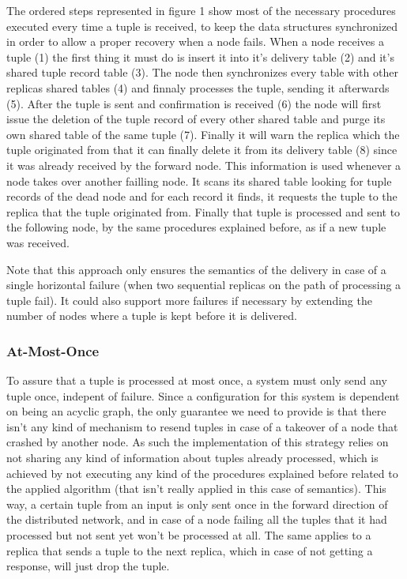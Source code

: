 \documentclass[times, 10pt,twocolumn]{article}
\begin{document}
The ordered steps represented in figure 1 show most of the necessary 
procedures executed every time a tuple is received, to keep the data structures synchronized in order to allow a
proper recovery when a node fails. When a node receives a tuple (1) the first
thing it must do is insert it into it's delivery table (2) and it's shared tuple
record table (3). The node then synchronizes every table with other replicas
shared tables (4) and finnaly processes the tuple, sending it afterwards (5). After the
tuple is sent and confirmation is received (6) the node will first issue the
deletion of the tuple record of every other shared table and purge its own
shared table of the same tuple (7). Finally it will warn the replica which the
tuple originated from that it can finally delete it from its delivery table (8)
since it was already received by the forward node. This information is
used whenever a node takes over another failling node. It scans its shared
table looking for tuple records of the dead node and for each record it finds,
it requests the tuple to the replica that the tuple originated from. Finally that tuple is
processed and sent to the following node, by the same procedures explained
before, as if a new tuple was received. 

Note that this approach only
ensures the semantics of the delivery in case of a single horizontal
failure (when two sequential replicas on the path of processing a tuple
fail). It could also support more failures if necessary by extending the
number of nodes where a tuple is kept before it is delivered.




\subsubsection{At-Most-Once}

To assure that a tuple is processed at most once, a system must only send
any tuple once, indepent of failure. Since a configuration for this system
is dependent on being an acyclic graph, the only guarantee we need to
provide is that there isn't any kind of mechanism to resend tuples in case
of a takeover of a node that crashed by another node.  As such the
implementation of this strategy relies on not sharing any kind of
information about tuples already processed, which is achieved by not executing
any kind of the procedures explained before related to the applied algorithm
(that isn't really applied in this case of semantics).
This way, a certain tuple from an input is only sent once in
the forward direction of the distributed network, and in case of a node
failing all the tuples that it had processed but not sent yet won't be
processed at all. The same applies to a replica that sends a tuple to the next
replica, which in case of not getting a response, will just drop the tuple.
\end{document}

